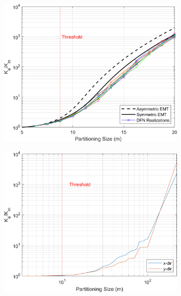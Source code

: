 \documentclass[Supplementary.tex]{subfiles}
\begin{document}
\begin{figure}[ht]
\begin{subfigure}{0.3\textwidth}
        \includegraphics[width=\textwidth]{FSU/Plot_FSU_Case_13_nohead.png}
        \label{fig:FSU_13}
    \end{subfigure}
    \begin{subfigure}{0.3\textwidth}
        \includegraphics[width=\textwidth]{FSU/Apodi2_FSU_nohead.png}
        \label{fig:FSU_Apodi_2}
    \end{subfigure}
    \begin{subfigure}{0.3\textwidth}

\end{subfigure}
\end{figure}
\end{document}
